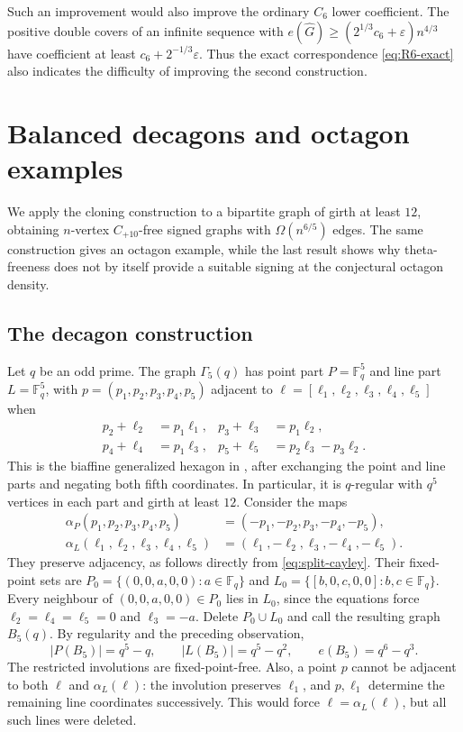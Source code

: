 \documentclass{article}
\newcommand{\FF}{\mathbb{F}}
\theoremstyle{definition}
\theoremstyle{remark}
\begin{document}
Such an improvement would also improve the ordinary $C_6$ lower
coefficient. The positive double covers of an infinite sequence with
$e(\widehat G)\geq(2^{1/3}c_6+\varepsilon)n^{4/3}$ have coefficient
at least $c_6+2^{-1/3}\varepsilon$.  Thus the exact correspondence
\eqref{eq:R6-exact} also indicates the difficulty of improving the
second construction.

\section{Balanced decagons and octagon examples}\label{sec:further-cycles}

We apply the cloning construction to a bipartite graph of girth at least
$12$, obtaining $n$-vertex $C_{+10}$-free signed graphs with
$\Omega(n^{6/5})$ edges.  The same construction gives an octagon example, while the last
result shows why theta-freeness does not by itself provide a suitable
signing at the conjectural octagon density.

\subsection{The decagon construction}

Let $q$ be an odd prime.  The graph $\Gamma_5(q)$ has point part
$P=\FF_q^5$ and line part $L=\FF_q^5$, with
$p=(p_1,p_2,p_3,p_4,p_5)$ adjacent to
$\ell=[\ell_1,\ell_2,\ell_3,\ell_4,\ell_5]$ when
\begin{equation}\label{eq:split-cayley}
\begin{aligned}
p_2+\ell_2&=p_1\ell_1, & p_3+\ell_3&=p_1\ell_2,\\
p_4+\ell_4&=p_1\ell_3, & p_5+\ell_5&=p_2\ell_3-p_3\ell_2.
\end{aligned}
\end{equation}
This is the biaffine generalized hexagon in
\cite[Section~4.1]{LazebnikWang2026}, after exchanging the point and line
parts and negating both fifth coordinates.  In particular, it is
$q$-regular with $q^5$ vertices in each part and girth at least $12$.
Consider the maps
\begin{align*}
\alpha_P(p_1,p_2,p_3,p_4,p_5)&=(-p_1,-p_2,p_3,-p_4,-p_5),\\
\alpha_L(\ell_1,\ell_2,\ell_3,\ell_4,\ell_5)
&=(\ell_1,-\ell_2,\ell_3,-\ell_4,-\ell_5).
\end{align*}
They preserve adjacency, as follows directly from \eqref{eq:split-cayley}.
Their fixed-point sets are
$P_0=\{(0,0,a,0,0):a\in\FF_q\}$ and
$L_0=\{[b,0,c,0,0]:b,c\in\FF_q\}$.  Every neighbour of
$(0,0,a,0,0)\in P_0$ lies in $L_0$, since the equations force
$\ell_2=\ell_4=\ell_5=0$ and $\ell_3=-a$.  Delete $P_0\cup L_0$ and call
the resulting graph $B_5(q)$.  By regularity and the preceding observation,
\begin{equation}\label{eq:B5-parameters}
|P(B_5)|=q^5-q,\qquad |L(B_5)|=q^5-q^2,\qquad e(B_5)=q^6-q^3.
\end{equation}
The restricted involutions are fixed-point-free.  Also, a point $p$ cannot
be adjacent to both $\ell$ and $\alpha_L(\ell)$: the involution preserves
$\ell_1$, and $p,\ell_1$ determine the remaining line coordinates
successively.  This would force $\ell=\alpha_L(\ell)$, but all such
lines were deleted.
\end{document}
